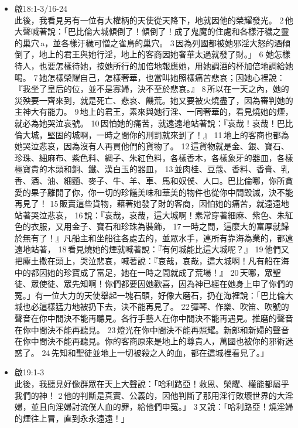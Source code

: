 \begin{itemize}
\item 啟18:1-3/16-24\\
此後，我看見另有一位有大權柄的天使從天降下，地就因他的榮耀發光。 2 他大聲喊著說：「巴比倫大城傾倒了！傾倒了！成了鬼魔的住處和各樣汙穢之靈的巢穴 a，並各樣汙穢可憎之雀鳥的巢穴。 3 因為列國都被她邪淫大怒的酒傾倒了，地上的君王與她行淫，地上的客商因她奢華太過就發了財。」
6 她怎樣待人，也要怎樣待她，按她所行的加倍地報應她，用她調酒的杯加倍地調給她喝。 7 她怎樣榮耀自己，怎樣奢華，也當叫她照樣痛苦悲哀；因她心裡說：『我坐了皇后的位，並不是寡婦，決不至於悲哀。』 8 所以在一天之內，她的災殃要一齊來到，就是死亡、悲哀、饑荒。她又要被火燒盡了，因為審判她的主神大有能力。 9 地上的君王，素來與她行淫、一同奢華的，看見燒她的煙，就必為她哭泣哀號。 10 因怕她的痛苦，就遠遠地站著說：『哀哉！哀哉！巴比倫大城，堅固的城啊，一時之間你的刑罰就來到了！』 11 地上的客商也都為她哭泣悲哀，因為沒有人再買他們的貨物了。 12 這貨物就是金、銀、寶石、珍珠、細麻布、紫色料、綢子、朱紅色料，各樣香木，各樣象牙的器皿，各樣極寶貴的木頭和銅、鐵、漢白玉的器皿， 13 並肉桂、豆蔻、香料、香膏、乳香、酒、油、細麵、麥子、牛、羊、車、馬和奴僕、人口。巴比倫哪，你所貪愛的果子離開了你，你一切的珍饈美味和華美的物件也從你中間毀滅，決不能再見了！ 15 販賣這些貨物，藉著她發了財的客商，因怕她的痛苦，就遠遠地站著哭泣悲哀， 16 說：『哀哉，哀哉，這大城啊！素常穿著細麻、紫色、朱紅色的衣服，又用金子、寶石和珍珠為裝飾， 17 一時之間，這麼大的富厚就歸於無有了！』凡船主和坐船往各處去的，並眾水手，連所有靠海為業的，都遠遠地站著， 18 看見燒她的煙就喊著說：『有何城能比這大城呢？』 19 他們又把塵土撒在頭上，哭泣悲哀，喊著說：『哀哉，哀哉，這大城啊！凡有船在海中的都因她的珍寶成了富足，她在一時之間就成了荒場！』 20 天哪，眾聖徒、眾使徒、眾先知啊！你們都要因她歡喜，因為神已經在她身上申了你們的冤。」有一位大力的天使舉起一塊石頭，好像大磨石，扔在海裡說：「巴比倫大城也必這樣猛力地被扔下去，決不能再見了。 22 彈琴、作樂、吹笛、吹號的聲音在你中間決不能再聽見。各行手藝人在你中間決不能再遇見。推磨的聲音在你中間決不能再聽見。 23 燈光在你中間決不能再照耀。新郎和新婦的聲音在你中間決不能再聽見。你的客商原來是地上的尊貴人，萬國也被你的邪術迷惑了。 24 先知和聖徒並地上一切被殺之人的血，都在這城裡看見了。」
\item 啟19:1-3\\
此後，我聽見好像群眾在天上大聲說：「哈利路亞！救恩、榮耀、權能都屬乎我們的神！ 2 他的判斷是真實、公義的，因他判斷了那用淫行敗壞世界的大淫婦，並且向淫婦討流僕人血的罪，給他們申冤。」 3 又說：「哈利路亞！燒淫婦的煙往上冒，直到永永遠遠！」
\end{itemize}




